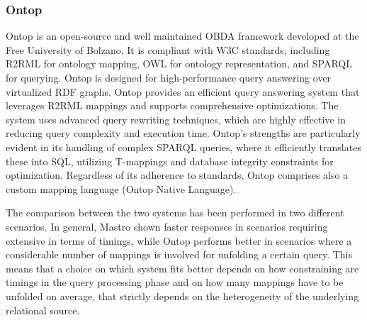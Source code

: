 \subsubsection{Ontop}
Ontop \cite{DBLP:conf/sebd/CalvaneseCKKKLR15} is an open-source and well maintained \ac{OBDA} framework developed at the Free University of Bolzano. It is compliant with \ac{W3C} standards, including R2RML for ontology mapping, \ac{OWL} for ontology representation, and \ac{SPARQL} for querying. Ontop is designed for high-performance query answering over virtualized \ac{RDF} graphs.
Ontop provides an efficient query answering system that leverages R2RML mappings and supports comprehensive optimizations. The system uses advanced query rewriting techniques, which are highly effective in reducing query complexity and execution time. Ontop's strengths are particularly evident in its handling of complex \ac{SPARQL} queries, where it efficiently translates these into \ac{SQL}, utilizing T-mappings and database integrity constraints for optimization.
Regardless of its adherence to standards, Ontop comprises also a custom mapping language (Ontop Native Language).

The comparison between the two systems has been performed in two different scenarios. In general, Mastro shown faster responses in scenarios requiring extensive in terms of timings, while Ontop performs better in scenarios where a considerable number of mappings is involved for unfolding a certain query.
This means that a choice on which system fits better depends on how constraining are timings in the query processing phase and on how many mappings have to be unfolded on average, that strictly depends on the heterogeneity of the underlying relational source.

